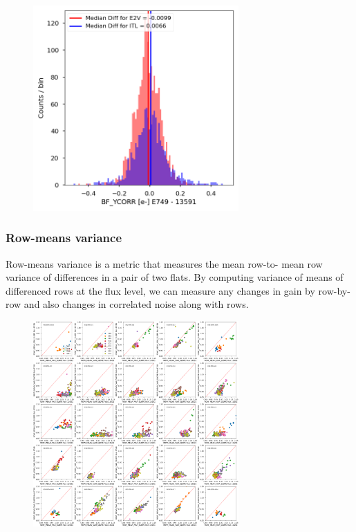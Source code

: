 \begin{figure}[H]
\begin{centering}
\includegraphics[width=0.7\textwidth]{figures/baselineCharacterization/BF_YCORR_13591_E749_diff.png}
\end{centering}
\end{figure}

\subsubsection{Row-means variance}\label{row-means-var}

Row-means variance is a metric that measures the mean row-to- mean row variance of differences in a pair of two flats. By computing variance of means of differenced rows at the flux level, we can measure any changes in gain by row-by-row and also changes in correlated noise along with rows.

\begin{figure}[H]
\begin{centering}
\includegraphics[width=0.7\textwidth]{figures/baselineCharacterization/13591_E749_ROW_MEAN_VAR_SLOPE.png}
\end{centering}
\end{figure}

